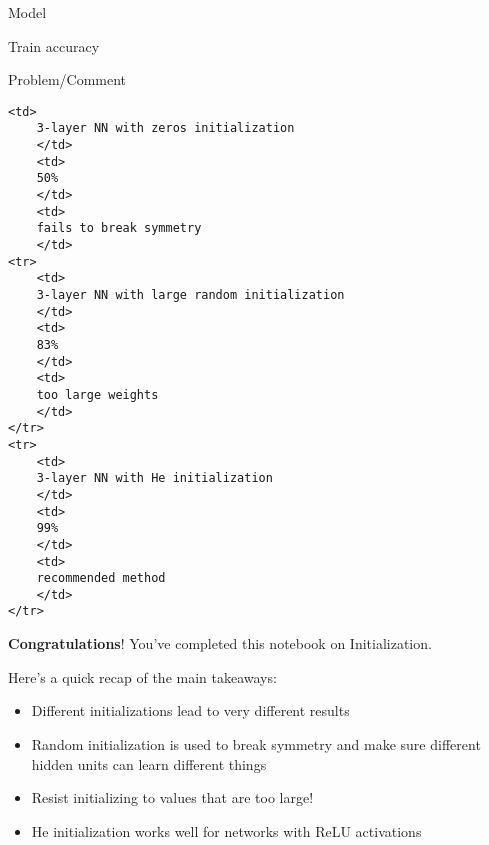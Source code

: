 \documentclass[11pt]{article}
\providecommand{\tightlist}{%
      \setlength{\itemsep}{0pt}\setlength{\parskip}{0pt}}
\begin{document}
Model

Train accuracy

Problem/Comment

\begin{verbatim}
<td>
    3-layer NN with zeros initialization
    </td>
    <td>
    50%
    </td>
    <td>
    fails to break symmetry
    </td>
<tr>
    <td>
    3-layer NN with large random initialization
    </td>
    <td>
    83%
    </td>
    <td>
    too large weights 
    </td>
</tr>
<tr>
    <td>
    3-layer NN with He initialization
    </td>
    <td>
    99%
    </td>
    <td>
    recommended method
    </td>
</tr>
\end{verbatim}

    \textbf{Congratulations}! You've completed this notebook on
Initialization.

Here's a quick recap of the main takeaways:

\begin{itemize}
\tightlist
\item
  Different initializations lead to very different results
\item
  Random initialization is used to break symmetry and make sure
  different hidden units can learn different things
\item
  Resist initializing to values that are too large!
\item
  He initialization works well for networks with ReLU activations
\end{itemize}


    
    
    
\end{document}
